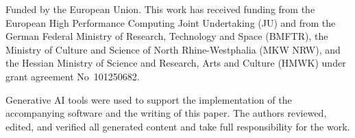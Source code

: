 \documentclass[manuscript,screen,nonacm]{acmart}
\begin{document}
\begin{acks}
Funded by the European Union. This work has received funding from the European High Performance Computing Joint Undertaking (JU) and from the German Federal Ministry of Research, Technology and Space (BMFTR), the Ministry of Culture and Science of North Rhine-Westphalia (MKW NRW), and the Hessian Ministry of Science and Research, Arts and Culture (HMWK) under grant agreement No~101250682.

Generative AI tools were used to support the implementation of the accompanying software and the writing of this paper. The authors reviewed, edited, and verified all generated content and take full responsibility for the work.
\end{acks}



\end{document}
